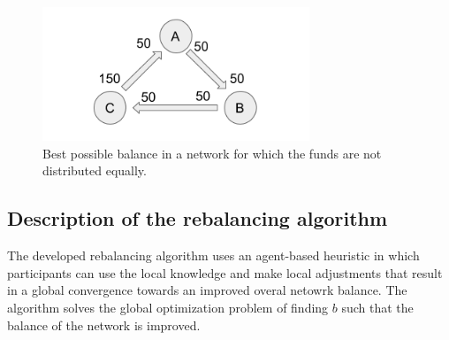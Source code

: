 \documentclass[a4paper]{paper}
\begin{document}
\begin{figure}
 \centering
 \includegraphics[width=8cm]{img/oddBalanced.png}
 \caption{Best possible balance in a network for which the funds are not distributed equally.}
 \label{fig:oddBalanced}
\end{figure}



\subsection{Description of the rebalancing algorithm}
\label{sec:Algorithm}

The developed rebalancing algorithm uses an agent-based heuristic in which participants can use the local knowledge and make local adjustments that result in a global convergence towards an improved overal netowrk balance. 
The algorithm solves the global optimization problem of finding $b$ such that the balance of the network is improved.
\end{document}
